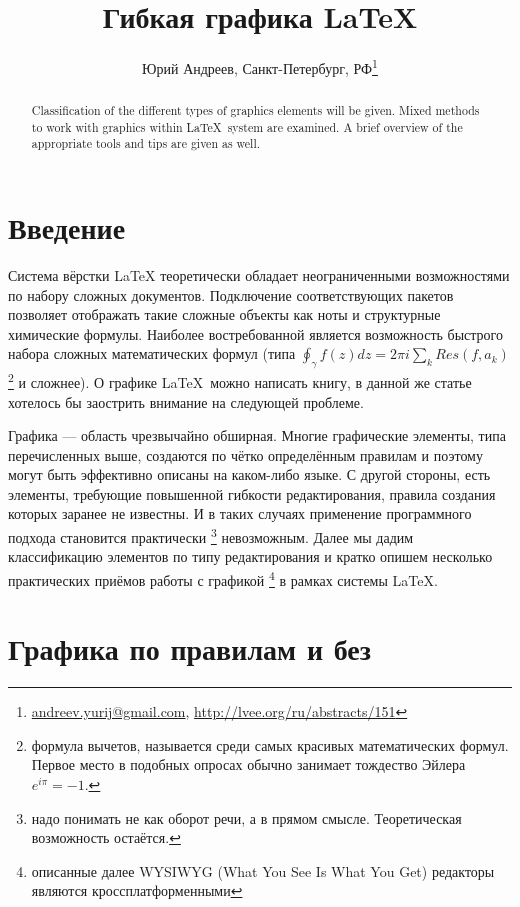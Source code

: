\documentclass[10pt, a5paper]{article}
\begin{document}
\title{Гибкая графика \LaTeX}
\author{Юрий Андреев, Санкт-Петербург, РФ\footnote{\url{andreev.yurij@gmail.com}, \url{http://lvee.org/ru/abstracts/151}}}
\maketitle
\begin{abstract}
Classification of the different types of graphics elements will be given. 
Mixed methods to work with graphics within \LaTeX \, system are examined.
A brief overview of the appropriate tools and tips are given as well.
\end{abstract}        

\section*{Введение}

Система вёрстки \LaTeX \cite{RG1} теоретически обладает неограниченными возможностями по 
набору сложных документов. Подключение соответствующих пакетов позволяет отображать такие 
сложные объекты как ноты и структурные химические формулы.   
Наиболее востребованной является возможность быстрого набора 
сложных математических формул 
(типа $\displaystyle{\oint_{\gamma} f(z)dz = 2\pi i \sum_k Res(f, a_k)}$ 
\footnote{формула вычетов, называется среди самых красивых математических формул. 
Первое место в подобных опросах обычно занимает тождество Эйлера $e^{i\pi}=-1$.}
и сложнее).
О графике \LaTeX \, можно написать книгу\cite{RG2}, в данной же статье хотелось бы заострить внимание на следующей проблеме.

Графика --- область чрезвычайно обширная. 
Многие графические элементы, типа перечисленных выше, создаются по чётко определённым правилам и поэтому 
могут быть эффективно описаны на каком-либо языке.
С другой стороны, есть элементы, требующие повышенной гибкости редактирования,
правила создания которых заранее не известны.
И в таких случаях применение программного подхода становится практически
\footnote{надо понимать не как оборот речи, а в прямом смысле. Теоретическая возможность остаётся.}
невозможным. 
Далее мы дадим классификацию элементов по типу редактирования 
и кратко опишем несколько практических приёмов работы с графикой
\footnote{описанные далее WYSIWYG (What You See Is What You Get) редакторы являются кроссплатформенными}
в рамках системы \LaTeX.

\section*{Графика по правилам и без}
\end{document}
